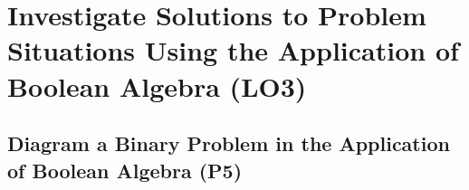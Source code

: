 \documentclass[12pt, a4paper, twoside]{report} %
\begin{document}
\chapter{Investigate Solutions to Problem Situations Using the Application of Boolean Algebra (LO3)}
\label{chap:LO3}

\section{Diagram a Binary Problem in the Application of Boolean Algebra (P5)}
\label{sec:P5}





\end{document}
